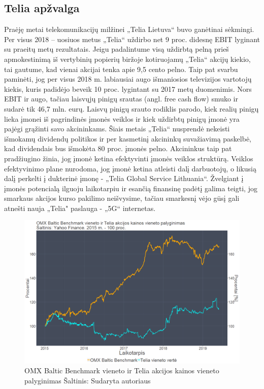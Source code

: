 \documentclass[12pt]{article}
\begin{document}
\subsection{Telia apžvalga}
Praėję metai telekomunikacijų milžinei „Telia Lietuva“ buvo ganėtinai sėkmingi. Per visus 2018 – uosiuos metus „Telia“ uždirbo net 9 proc. didesnę EBIT lyginant su praeitų metų rezultatais.  Jeigu padalintume visą uždirbtą pelną prieš apmokestinimą iš vertybinių popierių biržoje kotiruojamų „Telia“ akcijų kiekio, tai gautume, kad vienai akcijai tenka apie 9,5 cento pelno. Taip pat svarbu paminėti, jog per visus 2018 m. labiausiai augo išmaniosios televizijos vartotojų kiekis, kuris padidėjo beveik 10 proc. lygintant su 2017 metų duomenimis. Nors EBIT ir augo, tačiau laisvųjų pinigų srautas (angl. free cash flow) smuko ir sudarė tik 46,7 mln. eurų. Laisvų pinigų srauto rodiklis parodo, kiek realių pinigų lieka įmonei iš pagrindinės įmonės veiklos ir kiek uždirbtų pinigų įmonė yra pajėgi grąžinti savo akcininkams. Šiais metais „Telia“ nusprendė nekeisti išmokamų dividendų politikos ir per kasmetinį akcininkų suvažiavimą paskelbė, kad dividendais bus išmokėta 80 proc. įmonės pelno. Akcininkus taip pat pradžiugino žinia, jog įmonė ketina efektyvinti įmonės veiklos struktūrą. Veiklos efektyvinimo plane nurodoma, jog įmonė ketina atleisti dalį darbuotojų, o likusią dalį perkelti į dukterinė įmonę - „Telia Global Service Lithuania“. Žvelgiant į įmonės potencialą ilguoju laikotarpiu ir esančią finansinę padėtį galima teigti, jog smarkaus akcijos kurso pakilimo neišvysime, tačiau smarkesnį vėjo gūsį gali atnešti nauja „Telia" paslauga - „5G“ internetas.
\begin{figure}[H]
\captionsetup{justification=centering}
\center
\includegraphics[scale=0.4]{TEL.png}
\caption{OMX Baltic Benchmark vieneto ir Telia akcijos kainos vieneto palyginimas \newline
Šaltinis: Sudaryta autoriaus}
\end{figure}
\end{document}
